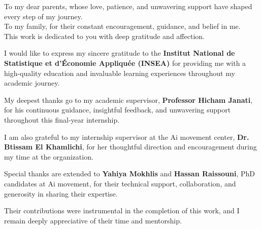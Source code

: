 \documentclass[../Main.tex]{subfiles}
\begin{document}
\begin{dedicace}
To my dear parents, whose love, patience, and unwavering support have shaped every step of my journey.\\[1ex]
To my family, for their constant encouragement, guidance, and belief in me.\\[1ex]
This work is dedicated to you with deep gratitude and affection.
\end{dedicace}


\clearpage
\begin{acknowledgement}
I would like to express my sincere gratitude to the \textbf{Institut National de Statistique et d’Économie Appliquée (INSEA)} for providing me with a high-quality education and invaluable learning experiences throughout my academic journey.

My deepest thanks go to my academic supervisor, \textbf{Professor Hicham Janati}, for his continuous guidance, insightful feedback, and unwavering support throughout this final-year internship.

I am also grateful to my internship supervisor at the Ai movement center, \textbf{Dr. Btissam El Khamlichi}, for her thoughtful direction and encouragement during my time at the organization.

Special thanks are extended to \textbf{Yahiya Mokhlis} and \textbf{Hassan Raissouni}, PhD candidates at Ai movement, for their technical support, collaboration, and generosity in sharing their expertise.

Their contributions were instrumental in the completion of this work, and I remain deeply appreciative of their time and mentorship.
\end{acknowledgement}
\end{document}

